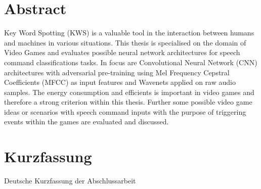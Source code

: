 
\chapter*{Abstract}\label{sec:shards_abstract}
Key Word Spotting (KWS) is a valuable tool in the interaction between humans and machines in various situations.
This thesis is specialised on the domain of Video Games and evaluates possible neural network architectures for speech command classifications tasks.
In focus are Convolutional Neural Network (CNN) architectures with adversarial pre-training using Mel Frequency Cepstral Coefficients (MFCC) as input features and Wavenets applied on raw audio samples.
The energy consumption and efficients is important in video games and therefore a strong criterion within this thesis.
Further some possible video game ideas or scenarios with speech command inputs with the purpose of triggering events within the games are evaluated and discussed.



\chapter*{Kurzfassung}
Deutsche Kurzfassung der Abschlussarbeit